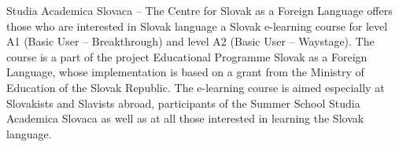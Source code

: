 Studia Academica Slovaca – The Centre for Slovak as a Foreign Language offers those who are interested in Slovak language a Slovak e-learning course for level A1 (Basic User – Breakthrough) and level A2 (Basic User – Waystage). The course is a part of the project Educational Programme Slovak as a Foreign Language, whose implementation is based on a grant from the Ministry of Education of the Slovak Republic. The e-learning course is aimed especially at Slovakists and Slavists abroad, participants of the Summer School Studia Academica Slovaca as well as at all those interested in learning the Slovak language.
